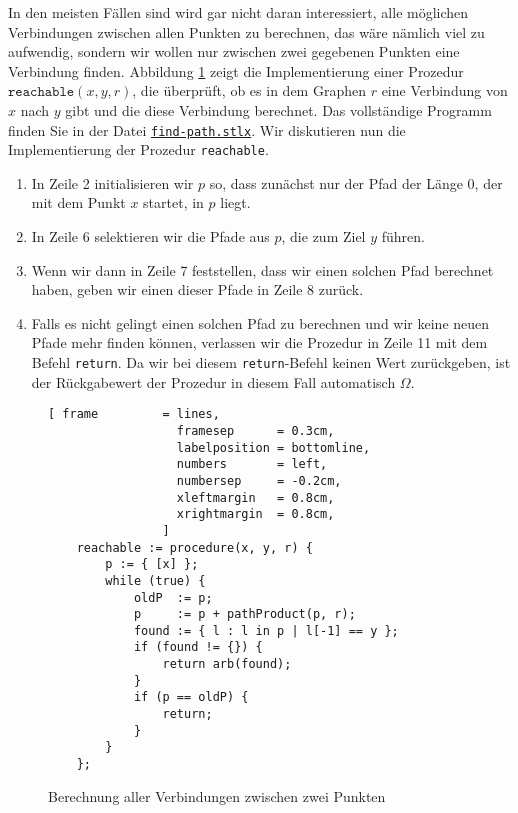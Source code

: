 In den meisten Fällen sind wird gar nicht daran interessiert, alle möglichen Verbindungen
zwischen allen Punkten zu berechnen, das wäre nämlich viel zu aufwendig, sondern wir
wollen nur zwischen zwei gegebenen Punkten 
eine Verbindung finden.  Abbildung \ref{fig:find-path} zeigt die Implementierung einer
Prozedur $\texttt{reachable}(x, y, r)$, die überprüft, ob es in dem Graphen $r$ eine
Verbindung von $x$ nach $y$ gibt und die diese Verbindung berechnet.  Das vollständige
Programm finden Sie in der Datei
\href{https://github.com/karlstroetmann/Logik/blob/master/SetlX/find-path.stlx}{\texttt{find-path.stlx}}.
Wir diskutieren nun die Implementierung der Prozedur \texttt{reachable}.
\begin{enumerate}
\item In Zeile 2 initialisieren wir $p$ so, dass zunächst nur der Pfad der Länge 0,
      der mit dem Punkt $x$  startet, in $p$ liegt.
\item In Zeile 6 selektieren wir die Pfade aus $p$, die zum Ziel $y$ führen.
\item Wenn wir dann in Zeile 7 feststellen, dass wir einen solchen Pfad berechnet haben,
      geben wir einen dieser Pfade in Zeile 8 zurück.
\item Falls es nicht gelingt einen solchen Pfad zu berechnen und wir keine neuen
      Pfade mehr finden können, verlassen wir die Prozedur in Zeile 11
      mit dem Befehl \texttt{return}.  Da wir bei diesem \texttt{return}-Befehl
      keinen Wert zurückgeben, ist der Rückgabewert der Prozedur in diesem Fall
      automatisch $\Omega$.
\end{enumerate}

\begin{figure}[!ht]
  \centering
\begin{Verbatim}[ frame         = lines, 
                  framesep      = 0.3cm, 
                  labelposition = bottomline,
                  numbers       = left,
                  numbersep     = -0.2cm,
                  xleftmargin   = 0.8cm,
                  xrightmargin  = 0.8cm,
                ]
    reachable := procedure(x, y, r) {
        p := { [x] };
        while (true) {
            oldP  := p;
            p     := p + pathProduct(p, r);
            found := { l : l in p | l[-1] == y };
            if (found != {}) {
                return arb(found);
            }
            if (p == oldP) {
                return;
            }
        }
    };
\end{Verbatim} 
\vspace*{-0.3cm}
\caption{Berechnung aller Verbindungen zwischen zwei Punkten}  
\label{fig:find-path}
\end{figure} %

